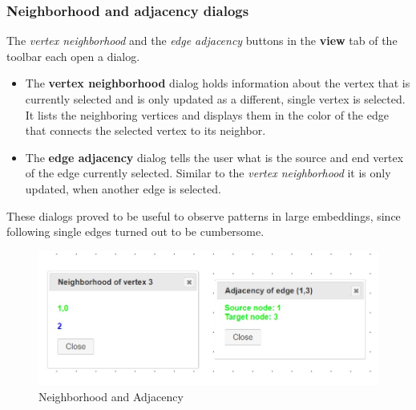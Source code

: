 \subsubsection{Neighborhood and adjacency dialogs}
\label{NandA}
The \textit{vertex neighborhood} and the \textit{edge adjacency} buttons in the \textbf{view} tab of the toolbar each open a dialog. \\
\begin{itemize}
\item The \textbf{vertex neighborhood} dialog holds information about the vertex that is currently selected and is only updated as a different, single vertex is selected. It lists the neighboring vertices and displays them in the color of the edge that connects the selected vertex to its neighbor.
\item The \textbf{edge adjacency} dialog tells the user what is the source and end vertex of the edge currently selected. Similar to the \textit{vertex neighborhood} it is only updated, when another edge is selected.
\end{itemize}
These dialogs proved to be useful to observe patterns in large embeddings, since following single edges turned out to be cumbersome.
\begin{figure}[!h]
\begin{center}
\includegraphics[width=1\textwidth]{figures/figSecond/NeighborAdjac.jpg}
\caption{Neighborhood and Adjacency}
\label{img:plzhltr}
\end{center}
\end{figure}

